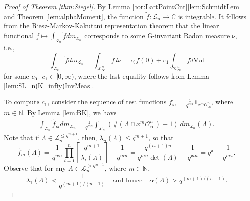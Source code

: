 \documentclass[11pt,a4paper,reqno]{amsart}
\def\vol{\mathrm{Vol}}
\theoremstyle{definition}
\theoremstyle{remark}
\numberwithin{equation}{section}
\begin{document}
\begin{proof}[Proof of Theorem \ref{thm:Siegel}]
    By Lemma \ref{cor:LattPointCnt}\eqref{lem:SchmidtLem} and Theorem \ref{lem:alphaMoment}, the function $\widetilde{f}:\mathcal{L}_n\rightarrow \mathbb{C}$ is integrable. It follows from the Riesz-Markov-Kakutani representation theorem that the linear functional $f\mapsto \int_{\mathcal{L}_n}\widetilde{f}dm_{\mathcal{L}_n}$ corresponds to some $\mathrm{G}$-invariant Radon measure $\nu$, i.e., $$\int_{\mathcal{L}_n}\widetilde{f}dm_{\mathcal{L}_n}=\int_{\mathcal{K}_{\infty}^n}fd\nu
    =c_0f(0)+c_1\int_{\mathcal K_\infty^n} f d\vol$$ 
    for some $c_0,\;c_1\in [0,\infty)$, where the last equality follows from Lemma \ref{lem:SL_n(K_infty)InvMeas}.
    
    To compute $c_1$, consider the sequence of test functions $f_m=\frac{1}{q^{mn}}\mathbf{1}_{x^m\mathcal{O}_{\infty}^n}$, where $m\in \mathbb N$. By Lemma \ref{lem:BK}, we have
      \begin{equation}
    \begin{split}
    \label{eqn:STLargeBalls}
        \int_{\mathcal{L}_n}\widetilde{f}_m dm_{\mathcal{L}_n}=\frac{1}{q^{mn}}\int_{\mathcal{L}_n}\left(\#\left(\Lambda\cap x^m\mathcal{O}_{\infty}^n\right)-1\right)\: dm_{\mathcal{L}_n}(\Lambda).
    \end{split}
    \end{equation}
    Note that if $\Lambda\in \mathcal L_n^{\le {q^{m+1}}}$, then, $\lambda_n(\Lambda)\leq q^{m+1}$, so that 
    \begin{equation}
        \widetilde{f_m}(\Lambda)=\frac{1}{q^{mn}}\prod_{i=1}^n\left\lceil\frac{q^{m+1}}{\lambda_i(\Lambda)}\right\rceil-\frac{1}{q^{mn}}=\frac{q^{(m+1)n}}{q^{mn}\det(\Lambda)}-\frac{1}{q^{mn}}=q^{n}-\frac{1}{q^{mn}}.
    \end{equation}
Observe that for any $\Lambda\in \mathcal L_n^{> q^{m+1}}$, where $m\in \mathbb N$,
\[
\lambda_1(\Lambda) < \frac 1 {q^{(m+1)/(n-1)}}
\quad \text{and hence} \quad
\alpha(\Lambda) > q^{(m+1)/(n-1)}.
\]


\end{proof}
\end{document}
